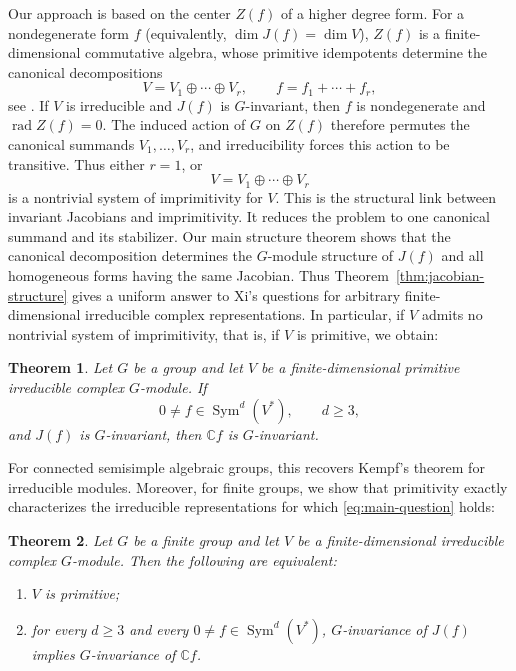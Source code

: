 \documentclass[11pt,reqno]{amsart}
\numberwithin{equation}{section}
\newtheorem{theorem}{Theorem}[section]
\theoremstyle{definition}
\theoremstyle{remark}
\newcommand{\C}{\mathbb C}
\newcommand{\Sym}{\operatorname{Sym}}
\newcommand{\rad}{\operatorname{rad}}
\begin{document}
Our approach is based on the center $Z(f)$ of a higher degree form.
For a nondegenerate form $f$ (equivalently,
$\dim J(f)=\dim V$), $Z(f)$ is a finite-dimensional commutative
algebra, whose primitive idempotents determine the canonical
decompositions
\[
  V=V_1\oplus\cdots\oplus V_r,
  \qquad
  f=f_1+\cdots+f_r,
\]
see \cite{Harrison,ORyanShapiro,HLYZ}.  If $V$ is irreducible and $J(f)$ is $G$-invariant, then $f$ is
nondegenerate and $\rad Z(f)=0$.  The induced action of $G$ on
$Z(f)$ therefore permutes the canonical summands
$V_1,\ldots,V_r$, and irreducibility forces this action to be
transitive.  Thus either $r=1$, or
\[
  V=V_1\oplus\cdots\oplus V_r
\]
is a nontrivial system of imprimitivity for $V$. This is the structural link between invariant Jacobians and
imprimitivity.  It reduces the problem to one canonical summand and
its stabilizer.  Our main structure theorem shows that the canonical decomposition determines the $G$-module structure of $J(f)$ and all homogeneous forms having the same
Jacobian.  Thus Theorem~\ref{thm:jacobian-structure} gives a uniform
answer to Xi's questions for arbitrary finite-dimensional irreducible
complex representations. In particular, if $V$ admits no nontrivial system of imprimitivity,
that is, if $V$ is primitive,  we obtain:

\begin{theorem}\label{thm:primitive}
Let $G$ be a group and let $V$ be a finite-dimensional primitive
irreducible complex $G$-module.  If
\[
  0\ne f\in\Sym^d(V^*),\qquad d\geq3,
\]
and $J(f)$ is $G$-invariant, then $\C f$ is $G$-invariant.
\end{theorem}

For connected semisimple algebraic groups, this recovers Kempf's
theorem for irreducible modules. Moreover, for finite groups,  we show that primitivity
exactly characterizes the irreducible representations for which
\eqref{eq:main-question} holds:

\begin{theorem}\label{thm:finite-converse}
Let $G$ be a finite group and let $V$ be a finite-dimensional irreducible complex $G$-module.
Then the following are equivalent:
\begin{enumerate}[label=\textup{(\roman*)},leftmargin=0.9cm]
\item $V$ is primitive;
\item for every $d\geq3$ and every
      $0\ne f\in\Sym^d(V^*)$, $G$-invariance of $J(f)$ implies
      $G$-invariance of $\C f$.
\end{enumerate}
\end{theorem}
\end{document}
